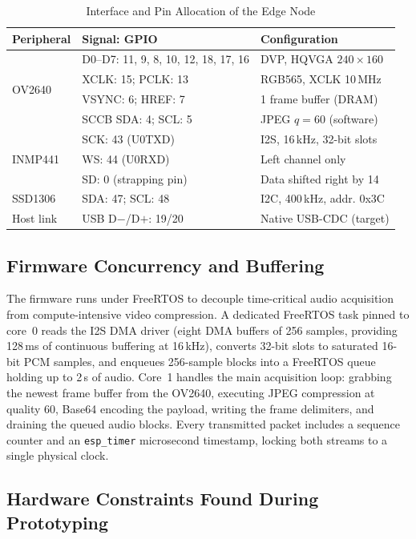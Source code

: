 \documentclass[journal]{IEEEtran}
\begin{document}
\begin{table}[!t]
\centering
\caption{Interface and Pin Allocation of the Edge Node}
\label{tab:pinout}
\footnotesize
\renewcommand{\arraystretch}{1.1}
\setlength{\tabcolsep}{3pt}
\begin{tabular}{@{}l l l@{}}
\toprule
\textbf{Peripheral} & \textbf{Signal: GPIO} & \textbf{Configuration} \\
\midrule
\multirow{4}{*}{OV2640} & D0--D7: 11, 9, 8, 10, 12, 18, 17, 16 & DVP, HQVGA $240{\times}160$ \\
 & XCLK: 15;\; PCLK: 13 & RGB565, XCLK 10\,MHz \\
 & VSYNC: 6;\; HREF: 7 & 1 frame buffer (DRAM) \\
 & SCCB SDA: 4;\; SCL: 5 & JPEG $q{=}60$ (software) \\
\midrule
\multirow{3}{*}{INMP441} & SCK: 43 (U0TXD) & I2S, 16\,kHz, 32-bit slots \\
 & WS: 44 (U0RXD) & Left channel only \\
 & SD: 0 (strapping pin) & Data shifted right by 14 \\
\midrule
SSD1306 & SDA: 47;\; SCL: 48 & I2C, 400\,kHz, addr. 0x3C \\
\midrule
Host link & USB D$-$/D$+$: 19/20 & Native USB-CDC (target) \\
\bottomrule
\end{tabular}
\end{table}

\subsection{Firmware Concurrency and Buffering}
\label{sec:firmware}
The firmware runs under FreeRTOS to decouple time-critical audio acquisition from compute-intensive video compression. A dedicated FreeRTOS task pinned to core~0 reads the I2S DMA driver (eight DMA buffers of 256 samples, providing 128\,ms of continuous buffering at 16\,kHz), converts 32-bit slots to saturated 16-bit PCM samples, and enqueues 256-sample blocks into a FreeRTOS queue holding up to 2\,s of audio. Core~1 handles the main acquisition loop: grabbing the newest frame buffer from the OV2640, executing JPEG compression at quality 60, Base64 encoding the payload, writing the frame delimiters, and draining the queued audio blocks. Every transmitted packet includes a sequence counter and an \texttt{esp\_timer} microsecond timestamp, locking both streams to a single physical clock.

\subsection{Hardware Constraints Found During Prototyping}
\label{sec:hw-constraints}
\end{document}
